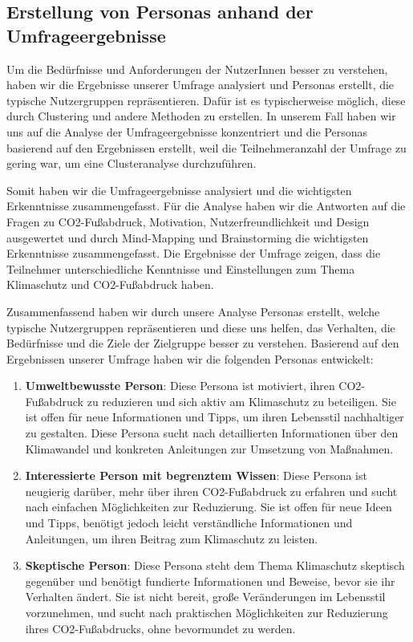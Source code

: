 \subsection{Erstellung von Personas anhand der Umfrageergebnisse}

Um die Bedürfnisse und Anforderungen der NutzerInnen besser zu verstehen, haben wir die Ergebnisse unserer Umfrage analysiert und Personas erstellt, die typische Nutzergruppen repräsentieren. Dafür ist es typischerweise möglich, diese durch Clustering und andere Methoden zu erstellen. In unserem Fall haben wir uns auf die Analyse der Umfrageergebnisse konzentriert und die Personas basierend auf den Ergebnissen erstellt, weil die Teilnehmeranzahl der Umfrage zu gering war, um eine Clusteranalyse durchzuführen.

Somit haben wir die Umfrageergebnisse analysiert und die wichtigsten Erkenntnisse zusammengefasst. Für die Analyse haben wir die Antworten auf die Fragen zu CO2-Fußabdruck, Motivation, Nutzerfreundlichkeit und Design ausgewertet und durch Mind-Mapping und Brainstorming die wichtigsten Erkenntnisse zusammengefasst. Die Ergebnisse der Umfrage zeigen, dass die Teilnehmer unterschiedliche Kenntnisse und Einstellungen zum Thema Klimaschutz und CO2-Fußabdruck haben.

Zusammenfassend haben wir durch unsere Analyse Personas erstellt, welche typische Nutzergruppen repräsentieren und diese uns helfen, das Verhalten, die Bedürfnisse und die Ziele der Zielgruppe besser zu verstehen. Basierend auf den Ergebnissen unserer Umfrage haben wir die folgenden Personas entwickelt:

\begin{enumerate}
    \item \textbf{Umweltbewusste Person}: Diese Persona ist motiviert, ihren CO2-Fußabdruck zu reduzieren und sich aktiv am Klimaschutz zu beteiligen. Sie ist offen für neue Informationen und Tipps, um ihren Lebensstil nachhaltiger zu gestalten. Diese Persona sucht nach detaillierten Informationen über den Klimawandel und konkreten Anleitungen zur Umsetzung von Maßnahmen.
    \item \textbf{Interessierte Person mit begrenztem Wissen}: Diese Persona ist neugierig darüber, mehr über ihren CO2-Fußabdruck zu erfahren und sucht nach einfachen Möglichkeiten zur Reduzierung. Sie ist offen für neue Ideen und Tipps, benötigt jedoch leicht verständliche Informationen und Anleitungen, um ihren Beitrag zum Klimaschutz zu leisten.

    \item \textbf{Skeptische Person}: Diese Persona steht dem Thema Klimaschutz skeptisch gegenüber und benötigt fundierte Informationen und Beweise, bevor sie ihr Verhalten ändert. Sie ist nicht bereit, große Veränderungen im Lebensstil vorzunehmen, und sucht nach praktischen Möglichkeiten zur Reduzierung ihres CO2-Fußabdrucks, ohne bevormundet zu werden.
\end{enumerate}

